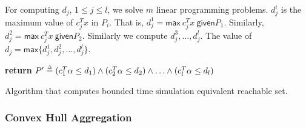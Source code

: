 For computing $d_j$, $1 \leq j \leq l$, we solve $m$ linear programming problems. $d_j^i$ is the maximum value of $c_j^T x$ in $P_i$. That is, $d_j^1 = \mathsf{max}~ c_j^T x~ \mathsf{given} P_1$. Similarly, $d_j^2 = \mathsf{max}~ c_j^T x~ \mathsf{given} P_2$. Similarly we compute $d_j^3, \ldots, d_j^l$. The value of $d_j = \mathsf{max} \{d_j^1, d_j^2, \ldots, d_j^l\}$.

\begin{algorithm}[h!]

{\bf return} $P' \mathrel{\stackrel{\scriptscriptstyle\Delta}{=}} (c_1^T \alpha \leq d_1) \wedge (c_2^T \alpha \leq d_2) \wedge \ldots \wedge (c_l^{T} \alpha \leq d_l)$\;
\caption{Algorithm that computes bounded time simulation equivalent reachable set.}
\label{alg:algoHybrid}
\end{algorithm}



\subsubsection{Convex Hull Aggregation}


